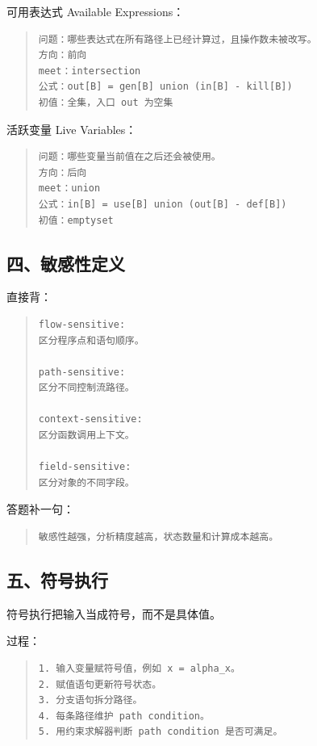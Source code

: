 \documentclass[UTF8,zihao=-4]{ctexart}
\begin{document}
可用表达式 Available Expressions：


\begin{quote}
\footnotesize
\begin{verbatim}
问题：哪些表达式在所有路径上已经计算过，且操作数未被改写。
方向：前向
meet：intersection
公式：out[B] = gen[B] union (in[B] - kill[B])
初值：全集，入口 out 为空集
\end{verbatim}
\end{quote}


活跃变量 Live Variables：


\begin{quote}
\footnotesize
\begin{verbatim}
问题：哪些变量当前值在之后还会被使用。
方向：后向
meet：union
公式：in[B] = use[B] union (out[B] - def[B])
初值：emptyset
\end{verbatim}
\end{quote}


\subsection{四、敏感性定义}


直接背：


\begin{quote}
\footnotesize
\begin{verbatim}
flow-sensitive:
区分程序点和语句顺序。

path-sensitive:
区分不同控制流路径。

context-sensitive:
区分函数调用上下文。

field-sensitive:
区分对象的不同字段。
\end{verbatim}
\end{quote}


答题补一句：


\begin{quote}
\footnotesize
\begin{verbatim}
敏感性越强，分析精度越高，状态数量和计算成本越高。
\end{verbatim}
\end{quote}


\subsection{五、符号执行}


符号执行把输入当成符号，而不是具体值。


过程：


\begin{quote}
\footnotesize
\begin{verbatim}
1. 输入变量赋符号值，例如 x = alpha_x。
2. 赋值语句更新符号状态。
3. 分支语句拆分路径。
4. 每条路径维护 path condition。
5. 用约束求解器判断 path condition 是否可满足。
\end{verbatim}
\end{quote}
\end{document}
